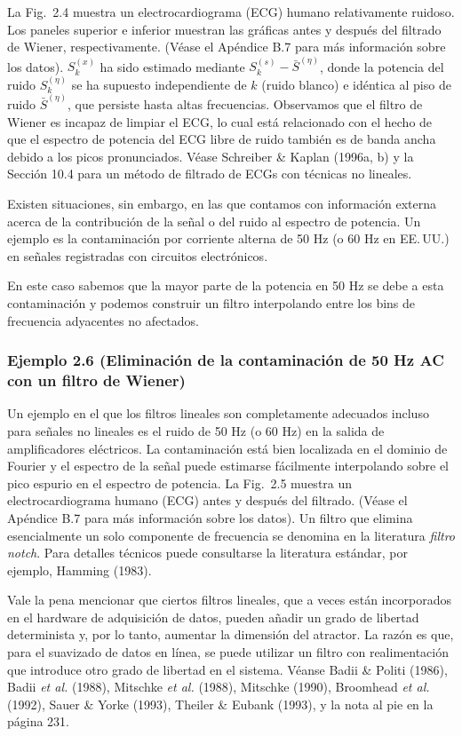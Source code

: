 \documentclass[10pt,a4paper]{book}
\begin{document}
La Fig.~2.4 muestra un electrocardiograma (ECG) humano relativamente ruidoso. Los paneles superior e inferior muestran las gráficas antes y después del filtrado de Wiener, respectivamente. (Véase el Apéndice B.7 para más información sobre los datos). $S_k^{(x)}$ ha sido estimado mediante $S_k^{(s)} - \bar{S}^{(\eta)}$, donde la potencia del ruido $S_k^{(\eta)}$ se ha supuesto independiente de $k$ (ruido blanco) e idéntica al piso de ruido $\bar{S}^{(\eta)}$, que persiste hasta altas frecuencias. Observamos que el filtro de Wiener es incapaz de limpiar el ECG, lo cual está relacionado con el hecho de que el espectro de potencia del ECG libre de ruido también es de banda ancha debido a los picos pronunciados. Véase Schreiber \& Kaplan (1996a, b) y la Sección 10.4 para un método de filtrado de ECGs con técnicas no lineales.

\bigskip

Existen situaciones, sin embargo, en las que contamos con información externa acerca de la contribución de la señal o del ruido al espectro de potencia. Un ejemplo es la contaminación por corriente alterna de 50 Hz (o 60 Hz en EE.\,UU.) en señales registradas con circuitos electrónicos.  

En este caso sabemos que la mayor parte de la potencia en 50 Hz se debe a esta contaminación y podemos construir un filtro interpolando entre los bins de frecuencia adyacentes no afectados.

\subsubsection*{Ejemplo 2.6 (Eliminación de la contaminación de 50 Hz AC con un filtro de Wiener)}

Un ejemplo en el que los filtros lineales son completamente adecuados incluso para señales no lineales es el ruido de 50 Hz (o 60 Hz) en la salida de amplificadores eléctricos. La contaminación está bien localizada en el dominio de Fourier y el espectro de la señal puede estimarse fácilmente interpolando sobre el pico espurio en el espectro de potencia.   La Fig.~2.5 muestra un electrocardiograma humano (ECG) antes y después del filtrado. (Véase el Apéndice B.7 para más información sobre los datos). Un filtro que elimina esencialmente un solo componente de frecuencia se denomina en la literatura \emph{filtro notch}. Para detalles técnicos puede consultarse la literatura estándar, por ejemplo, Hamming (1983).

\bigskip

Vale la pena mencionar que ciertos filtros lineales, que a veces están incorporados en el hardware de adquisición de datos, pueden añadir un grado de libertad determinista y, por lo tanto, aumentar la dimensión del atractor. La razón es que, para el suavizado de datos en línea, se puede utilizar un filtro con realimentación que introduce otro grado de libertad en el sistema. Véanse Badii \& Politi (1986), Badii \emph{et al.} (1988), Mitschke \emph{et al.} (1988), Mitschke (1990), Broomhead \emph{et al.} (1992), Sauer \& Yorke (1993), Theiler \& Eubank (1993), y la nota al pie en la página 231.
\end{document}
